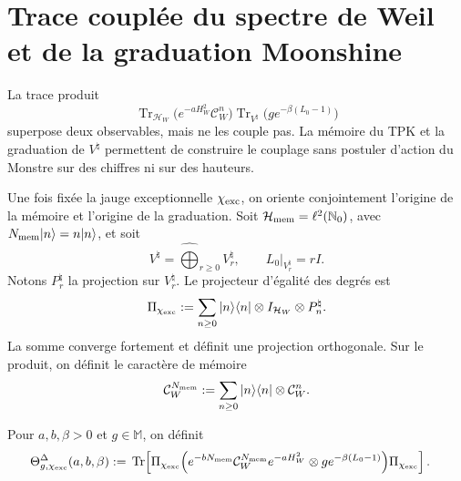 \section{Trace couplée du spectre de Weil et de la graduation Moonshine}
\label{sec:cpe-traza-rh-moonshine}

La trace produit
\[
 \operatorname{Tr}_{\mathcal H_W}
 \bigl(e^{-aH_W^2}\mathcal C_W^n\bigr)
 \operatorname{Tr}_{V^\natural}
 \bigl(g e^{-\beta(L_0-1)}\bigr)
\]
superpose deux observables, mais ne les couple pas. La mémoire du TPK et la
graduation de \(V^\natural\) permettent de construire le couplage sans postuler
d'action du Monstre sur des chiffres ni sur des hauteurs.

Une fois fixée la jauge exceptionnelle \(\chi_{\rm exc}\), on oriente conjointement
l'origine de la mémoire et l'origine de la graduation. Soit
\(\mathcal H_{\rm mem}=\ell^2(\mathbb N_0)\), avec
\(N_{\rm mem}|n\rangle=n|n\rangle\), et soit
\[
 V^\natural=\widehat\bigoplus_{r\ge0}V^\natural_r,
 \qquad L_0|_{V^\natural_r}=rI.
\]
Notons \(P_r^\natural\) la projection sur
\(V^\natural_r\). Le projecteur d'égalité des degrés est
\begin{equation}
 \Pi_{\chi_{\rm exc}}
 :=\sum_{n\ge0}|n\rangle\langle n|
 \otimes I_{\mathcal H_W}\otimes P_n^\natural.
 \label{eq:cpe-proyector-diagonal-grados}
\end{equation}
La somme converge fortement et définit une projection orthogonale. Sur le
produit, on définit le caractère de mémoire
\begin{equation}
 \mathcal C_W^{N_{\rm mem}}
 :=\sum_{n\ge0}|n\rangle\langle n|
 \otimes\mathcal C_W^n.
 \label{eq:cpe-cayley-memoria}
\end{equation}

\begin{definition}
\label{def:cpe-traza-diagonal}
Pour \(a,b,\beta>0\) et \(g\in\mathbb M\), on définit
\begin{equation}
\begin{aligned}
 \Theta^{\Delta}_{g,\chi_{\rm exc}}(a,b,\beta)
 :={}&\operatorname{Tr}\!\left[
 \Pi_{\chi_{\rm exc}}
 \Bigl(
 e^{-bN_{\rm mem}}
 \mathcal C_W^{N_{\rm mem}}e^{-aH_W^2}
 \otimes g e^{-\beta(L_0-1)}
 \Bigr)
 \Pi_{\chi_{\rm exc}}
 \right].
 \label{eq:cpe-traza-diagonal-def}
\end{aligned}
\end{equation}
\end{definition}

